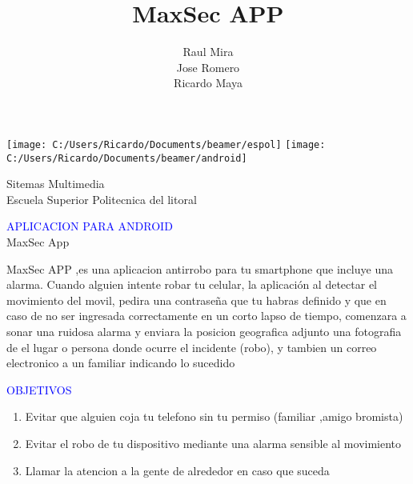 \documentclass{beamer}
\title{MaxSec APP}
\author{Raul Mira \\ Jose Romero \\ Ricardo Maya}
\begin{document}
  \begin{frame}
            \texttt{[image: C:/Users/Ricardo/Documents/beamer/espol]} \hspace*{7.3cm}
             \texttt{[image: C:/Users/Ricardo/Documents/beamer/android]}
            \titlepage
            \scriptsize
                 \begin{center}
                     Sitemas Multimedia \\
                      Escuela Superior Politecnica del litoral \\
                  \end{center}
     \end{frame}

  \begin{frame}
    
   
    
    \scriptsize
    
    \begin{center}
       \textcolor{blue}{APLICACION PARA ANDROID \\}
      MaxSec App \\
    \end{center}
    
    
    MaxSec APP ,es una aplicacion antirrobo para tu smartphone que incluye una alarma. Cuando alguien intente robar tu celular, la aplicación al detectar el movimiento del movil,
pedira una contraseña que tu habras definido y que en caso de no ser ingresada correctamente en un corto lapso de tiempo, comenzara a sonar una ruidosa alarma y
enviara la posicion geografica adjunto una fotografia de el lugar o persona donde ocurre el incidente (robo), y tambien un correo electronico a un familiar indicando lo sucedido
    
  \end{frame}
  
   \begin{frame}
      
       \begin{center}
        \textcolor{blue}{OBJETIVOS\\}
       \end{center}

     \begin{enumerate}
      \item<1-> Evitar que alguien coja tu telefono sin tu permiso (familiar ,amigo bromista)
      \item<1-> Evitar el robo de tu dispositivo mediante una alarma sensible al movimiento
      \item<1-> Llamar la atencion a la gente de alrededor en caso que suceda
      \end{enumerate}
     \end{frame}   
\end{document}

